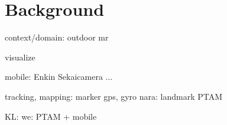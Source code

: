 \chapter{Background}
\label{Chapter2}


context/domain: outdoor mr

visualize

mobile:
Enkin
Sekaicamera
...

tracking, mapping:
marker
gps, gyro
nara: landmark
PTAM

KL:
we: PTAM + mobile
